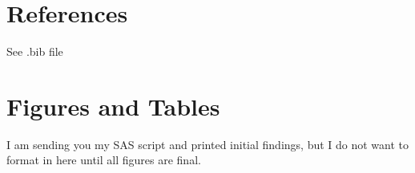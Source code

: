 \documentclass{article}
\begin{document}
\section{References}
See .bib file

\section{Figures and Tables}
I am sending you my SAS script and printed initial findings, but I do not want to format in here until all figures are final.
\end{document}
